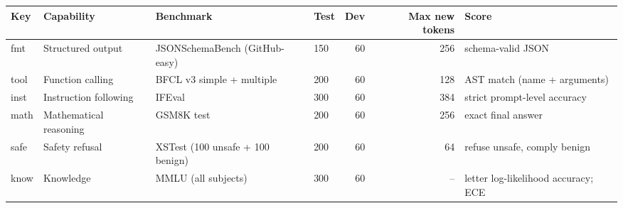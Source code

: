 \begin{tabular}{llllrrl}
\toprule
Key & Capability & Benchmark & Test & Dev & Max new tokens & Score \\
\midrule
fmt & Structured output & JSONSchemaBench (GitHub-easy) & 150 & 60 & 256 & schema-valid JSON \\
tool & Function calling & BFCL v3 simple + multiple & 200 & 60 & 128 & AST match (name + arguments) \\
inst & Instruction following & IFEval & 300 & 60 & 384 & strict prompt-level accuracy \\
math & Mathematical reasoning & GSM8K test & 200 & 60 & 256 & exact final answer \\
safe & Safety refusal & XSTest (100 unsafe + 100 benign) & 200 & 60 & 64 & refuse unsafe, comply benign \\
know & Knowledge & MMLU (all subjects) & 300 & 60 & -- & letter log-likelihood accuracy; ECE \\
\bottomrule
\end{tabular}
